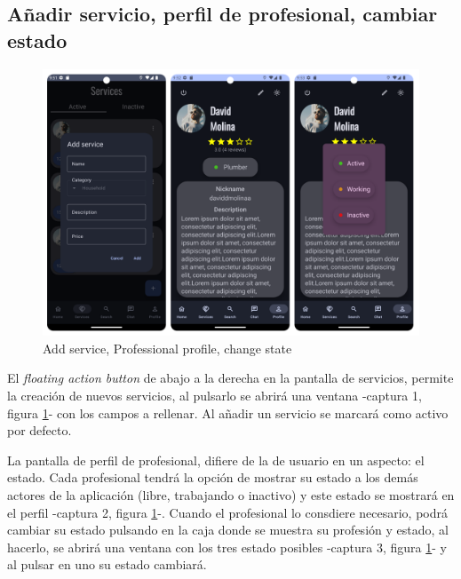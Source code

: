 \subsection{Añadir servicio, perfil de profesional, cambiar estado}
\begin{figure}[h]
	\centering
	\includegraphics[width = 1\textwidth]{Imagenes/capturasApp/add_profile_state.png}
	\caption{Add service, Professional profile, change state}
	\label{fig:capApp7}
\end{figure}

El \textit{floating action button} de abajo a la derecha en la pantalla de servicios, permite la creación de nuevos servicios, al pulsarlo se abrirá una ventana -captura 1, figura \ref{fig:capApp7}- con los campos a rellenar. Al añadir un servicio se marcará como activo por defecto.

La pantalla de perfil de profesional, difiere de la de usuario en un aspecto: el estado. Cada profesional tendrá la opción de mostrar su estado a los demás actores de la aplicación (libre, trabajando o inactivo) y este estado se mostrará en el perfil -captura 2, figura \ref{fig:capApp7}-. Cuando el profesional lo consdiere necesario, podrá cambiar su estado pulsando en la caja donde se muestra su profesión y estado, al hacerlo, se abrirá una ventana con los tres estado posibles -captura 3, figura \ref{fig:capApp7}- y al pulsar en uno su estado cambiará.